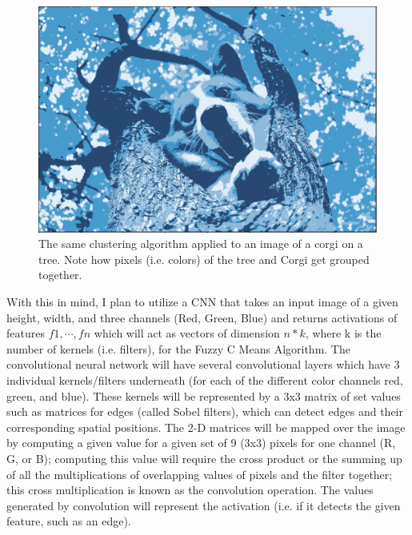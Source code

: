 \documentclass[10pt,twocolumn]{article}
\begin{document}
\begin{figure}[h]
 \centering
 \includegraphics[scale=0.2]{corgi-tree.png}
 \vspace{20px}
 \caption{The same clustering algorithm applied to an image of a corgi on a tree. Note how pixels (i.e. colors) of the tree and Corgi get grouped together.}
 \label{corgi:tree}
\end{figure}


With this in mind, I plan to utilize a CNN that takes an input image of a given height, width, and three channels (Red, Green, Blue) and returns activations of features \( {f1, \cdots, fn} \) which will act as vectors of dimension \(n * k\), where k is the number of kernels (i.e. filters), for the Fuzzy C Means Algorithm. The convolutional neural network will have several convolutional layers which have 3 individual kernels/filters underneath (for each of the different color channels red, green, and blue). These kernels will be represented by a 3x3 matrix of set values such as matrices for edges (called Sobel filters), which can detect edges and their corresponding spatial positions. The 2-D matrices will be mapped over the image by computing a given value for a given set of 9 (3x3) pixels for one channel (R, G, or B); computing this value will require the cross product or the summing up of all the multiplications of overlapping values of pixels and the filter together; this cross multiplication is known as the convolution operation. The values generated by convolution will represent the activation (i.e. if it detects the given feature, such as an edge). 

\end{document}
